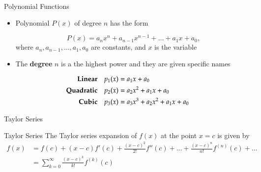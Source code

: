 \documentclass[10pt]{beamer}
\begin{document}
\begin{frame} {Polynomial Functions}

\begin{itemize}

\bigskip

\item Polynomial $P(x)$ of degree $n$ has the form

\[ P(x) = a_nx^n + a_{n-1}x^{n-1} + \ldots + a_1x + a_0, \]
where $a_n, a_{n-1}, \ldots, a_1, a_0$ are constants, and $x$ is the variable

\item The \textbf{degree} $n$ is a the highest power and they are given specific names
\end{itemize}
\begin{align*}
\text{\textbf{Linear}}\quad p_1(x) &= a_1 x + a_0\\
\text{\textbf{Quadratic}}\quad p_2(x) &= a_2x^2 + a_1 x + a_0\\
\text{\textbf{Cubic}}\quad p_3(x) &= a_3 x^3 + a_2x^2 + a_1 x + a_0\\
\end{align*}

\end{frame}
\begin{frame}{Taylor Series}

{
}

\begin{block}{Taylor Series}
  The Taylor series expansion of $f(x)$ at the point $x=c$ is given by
  \begin{align*}
    f(x) &= f(c) + (x-c) f'(c) + \frac{(x-c)^2}{2!} f''(c) + \dots +
\frac{(x-c)^n}{n!} f^{(n)}(c)+\dots\\
        &= \sum_{k=0}^{\infty} \frac{(x-c)^{k}}{k!} f^{(k)}(c)
\end{align*}
\end{block}


\end{frame}
\end{document}
